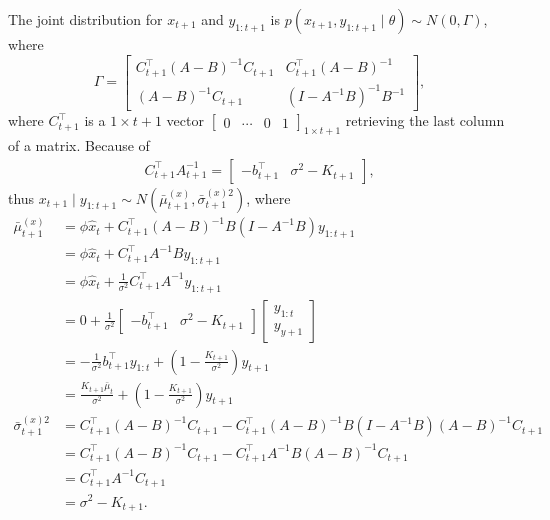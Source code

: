The joint distribution for $x_{t+1}$ and $y_{1:t+1}$ is $p(x_{t+1}, y_{1:t+1}  \mid  \theta)\sim N(0,\Gamma)$, where
\begin{equation*}
\Gamma=\begin{bmatrix} C_{t+1}^\top(A-B)^{-1}C_{t+1} & C_{t+1}^\top(A-B)^{-1}\\(A-B)^{-1}C_{t+1} & (I-A^{-1}B)^{-1}B^{-1} \end{bmatrix},
\end{equation*}
where $C_{t+1}^\top$ is a $1\times t+1$ vector $\left[ \begin{array}{cccc} 0 &\cdots & 0 & 1\end{array} \right]_{1 \times t+1}$ retrieving the last column of a matrix. Because of 
\begin{align*}
C_{t+1}^\top A_{t+1}^{-1} = \left[\begin{matrix} - b_{t+1}^\top & \sigma^2- K_{t+1} \end{matrix} \right],
\end{align*}
thus $x_{t+1}\mid y_{1:t+1}\sim N(\bar{\mu}_{t+1}^{(x)},\bar{\sigma}_{t+1}^{(x)2})$, where
\begin{align*}
\bar{\mu}_{t+1}^{(x)}       &= \phi \hat{x}_{t} +  C_{t+1}^\top (A-B)^{-1}B (I-A^{-1}B)y_{1:t+1}\\
                      &= \phi \hat{x}_{t} +  C_{t+1}^\top A^{-1}B y_{1:t+1} \\ &= \phi \hat{x}_{t} +  \frac{1}{\sigma^2}C_{t+1}^\top A^{-1} y_{1:t+1}\\
                      &=0+  \frac{1}{\sigma^2}\left[\begin{matrix} - b_{t+1}^\top & \sigma^2- K_{t+1} \end{matrix} \right]  \left[\begin{matrix} y_{1:t} \\ y_{y+1} \end{matrix} \right] \\
                      &= - \frac{1}{\sigma^2}b_{t+1}^\top y_{1:t}+(1-\frac{K_{t+1}}{\sigma^2})y_{t+1}\\
                      &=\frac{K_{t+1}\bar{\mu}_t}{\sigma^2}+(1-\frac{K_{t+1}}{\sigma^2})y_{t+1} \\
\bar{\sigma}_{t+1}^{(x)2}&=C_{t+1}^\top(A-B)^{-1}C_{t+1}-  C_{t+1}^\top(A-B)^{-1}  B(I-A^{-1}B) (A-B)^{-1}C_{t+1}\\
                      &= C_{t+1}^\top(A-B)^{-1}C_{t+1} -  C_{t+1}^\top A^{-1}B(A-B)^{-1}C_{t+1}\\
                      &= C_{t+1}^\top A^{-1}C_{t+1} \\ &= \sigma^2-K_{t+1}.
\end{align*}



